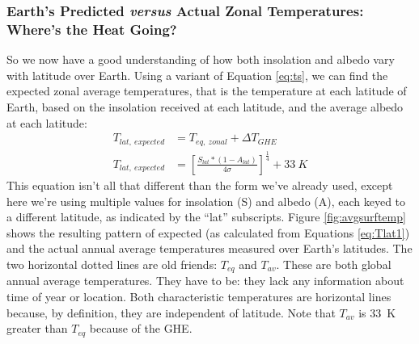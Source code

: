 \documentclass[amstex,12pt]{book}
\begin{document}
\subsubsection{Earth's Predicted \textit{versus} Actual Zonal Temperatures: Where's the Heat Going?}
So we now have a good understanding of how both insolation and albedo vary with latitude over Earth. Using a variant of Equation \ref{eq:ts}, we can find the expected zonal average temperatures, that is the temperature at each latitude of Earth, based on the insolation received at each latitude, and the average albedo at each latitude:
\begin{align}
	T_{lat,\ expected}&=T_{eq,\ zonal}+\Delta T_{GHE}\\ \label{eq:Tlat1}
	T_{lat,\ expected}&=\left[\frac{S_{lat}*\left(1-A_{lat}\right)}{4 \sigma}\right]^{\frac{1}{4}}+ 33\ K
\end{align}
This equation isn't all that different than the form we've already used, except here we're using multiple values for insolation (S) and albedo (A), each keyed to a different latitude, as indicated by the ``lat'' subscripts. Figure \ref{fig:avgsurftemp} shows the resulting pattern of expected (as calculated from Equations \ref{eq:Tlat1}) and the actual annual average temperatures measured over Earth's latitudes. The two horizontal dotted lines are old friends: $T_{eq}$ and $T_{av}$. These are both global annual average temperatures. They have to be: they lack any information about time of year or location. Both characteristic temperatures are horizontal lines because, by definition, they are independent of latitude. Note that $T_{av}$ is \SI{33}{\kelvin} greater than $T_{eq}$ because of the GHE.\\
\end{document}

